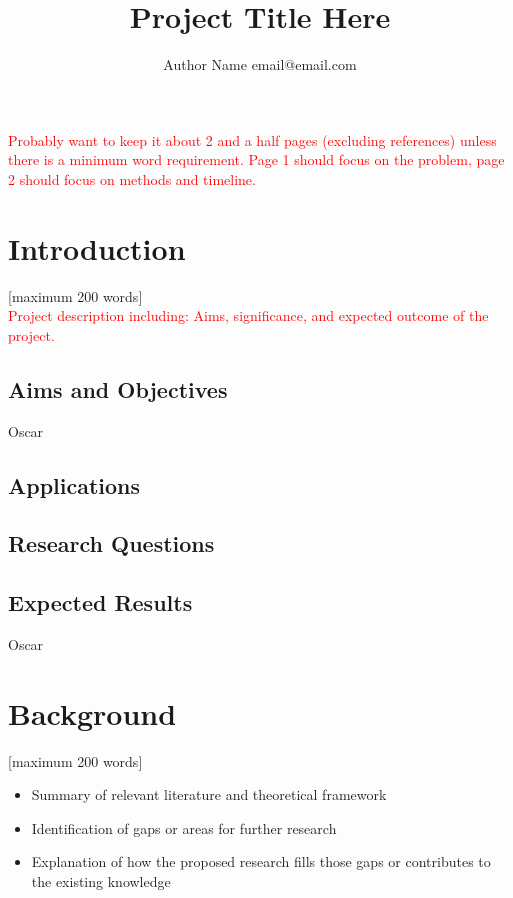 \documentclass[12pt]{article}
\title{
  Project Title Here
}
\author{
Author Name \large{email@email.com}
}
\begin{document}
\maketitle

\textcolor{red}{Probably want to keep it about 2 and a half pages (excluding references) unless there is a minimum word requirement. Page 1 should focus on the problem, page 2 should focus on methods and timeline.}

\section{Introduction}
[maximum 200 words] \\

\noindent \textcolor{red}{Project description including: Aims, significance, and expected outcome of the project.}

\subsection{Aims and Objectives}\label{subsec:aims}
Oscar
\subsection{Applications}\label{subsec:applications}

\subsection{Research Questions}\label{subsec:questions}

\subsection{Expected Results}\label{subsec:expected-results}
Oscar
\section{Background}\label{sec:background}
[maximum 200 words] \\

\begin{itemize}
    \item Summary of relevant literature and theoretical framework
    \item Identification of gaps or areas for further research
    \item Explanation of how the proposed research fills those gaps or contributes to the existing knowledge
\end{itemize}
\end{document}
